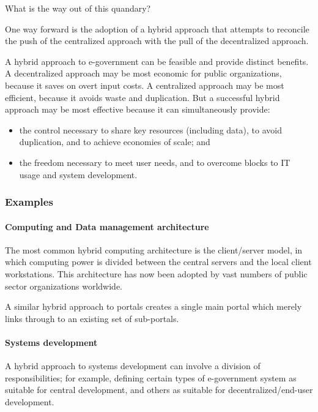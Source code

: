What is the way out of this quandary?

One way forward is the adoption of a hybrid approach that attempts to reconcile the push of the centralized approach with the pull of the decentralized approach.



A hybrid approach to e-government can be feasible and
provide distinct benefits. A decentralized approach may be most economic for public
organizations, because it saves on overt input
costs. A centralized approach may be most efficient, because it avoids waste and duplication.
But a successful hybrid approach may be most
effective because it can simultaneously provide:

\begin{itemize}
	\item the control necessary to share key resources
	(including data), to avoid duplication, and
	to achieve economies of scale; and
	\item the freedom necessary to meet user
	needs, and to overcome blocks to IT
	usage and system development.
\end{itemize}



\subsubsection*{Examples}

\paragraph*{Computing and Data management architecture}
The most common hybrid computing architecture is the client/server model, in which computing power is divided between the central servers and the local client workstations. This architecture has now been adopted by vast numbers of public sector organizations worldwide.


A similar hybrid approach to portals
creates a single main portal which merely
links through to an existing set of sub-portals.


\paragraph*{Systems development}
A hybrid approach to systems development can involve a division of responsibilities; for example, defining certain types
of e-government system as suitable for
central development, and others as suitable
for decentralized/end-user development.

